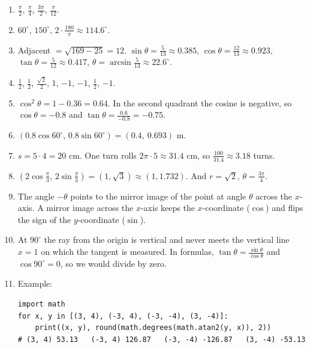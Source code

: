 \begin{enumerate}[label=\textbf{\ansnum.\arabic*}]
  \item $\frac\pi2$, $\frac\pi4$, $\frac{3\pi}{2}$, $\frac{\pi}{12}$.
  \item $60^\circ$, $150^\circ$, $2\cdot\frac{180}{\pi}\approx114.6^\circ$.
  \item Adjacent $=\sqrt{169-25}=12$. $\sin\theta=\frac5{13}\approx0.385$, $\cos\theta=\frac{12}{13}\approx0.923$, $\tan\theta=\frac5{12}\approx0.417$, $\theta=\arcsin\frac5{13}\approx22.6^\circ$.
  \item $\frac12$, $\frac12$, $\frac{\sqrt2}2$, $1$, $-1$, $-1$, $\frac12$, $-1$.
  \item $\cos^2\theta=1-0.36=0.64$. In the second quadrant the cosine is negative, so $\cos\theta=-0.8$ and $\tan\theta=\frac{0.6}{-0.8}=-0.75$.
  \item $(0.8\cos60^\circ,\,0.8\sin60^\circ)=(0.4,\ 0.693)$ m.
  \item $s=5\cdot4=20$ cm. One turn rolls $2\pi\cdot5\approx31.4$ cm, so $\frac{100}{31.4}\approx3.18$ turns.
  \item $(2\cos\frac\pi3,\,2\sin\frac\pi3)=(1,\sqrt3)\approx(1,1.732)$. And $r=\sqrt2$, $\theta=\frac{3\pi}{4}$.
  \item The angle $-\theta$ points to the mirror image of the point at angle $\theta$ across the $x$-axis. A mirror image across the $x$-axis keeps the $x$-coordinate ($\cos$) and flips the sign of the $y$-coordinate ($\sin$).
  \item At $90^\circ$ the ray from the origin is vertical and never meets the vertical line $x=1$ on which the tangent is measured. In formulas, $\tan\theta=\frac{\sin\theta}{\cos\theta}$ and $\cos90^\circ=0$, so we would divide by zero.
  \item Example:
\begin{verbatim}
import math
for x, y in [(3, 4), (-3, 4), (-3, -4), (3, -4)]:
    print((x, y), round(math.degrees(math.atan2(y, x)), 2))
# (3, 4) 53.13   (-3, 4) 126.87   (-3, -4) -126.87   (3, -4) -53.13
\end{verbatim}
\end{enumerate}
